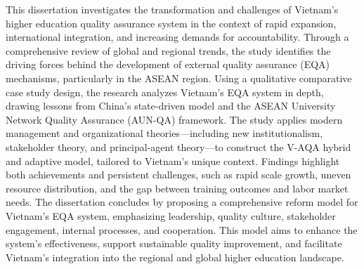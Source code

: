 \begin{eabstract}
This dissertation investigates the transformation and challenges of Vietnam’s higher education quality assurance system in the context of rapid expansion, international integration, and increasing demands for accountability. Through a comprehensive review of global and regional trends, the study identifies the driving forces behind the development of external quality assurance (EQA) mechanisms, particularly in the ASEAN region. Using a qualitative comparative case study design, the research analyzes Vietnam’s EQA system in depth, drawing lessons from China’s state-driven model and the ASEAN University Network Quality Assurance (AUN-QA) framework. The study applies modern management and organizational theories—including new institutionalism, stakeholder theory, and principal-agent theory—to construct the V-AQA hybrid and adaptive model, tailored to Vietnam’s unique context. Findings highlight both achievements and persistent challenges, such as rapid scale growth, uneven resource distribution, and the gap between training outcomes and labor market needs. The dissertation concludes by proposing a comprehensive reform model for Vietnam’s EQA system, emphasizing leadership, quality culture, stakeholder engagement, internal processes, and cooperation. This model aims to enhance the system’s effectiveness, support sustainable quality improvement, and facilitate Vietnam’s integration into the regional and global higher education landscape.
\end{eabstract}


